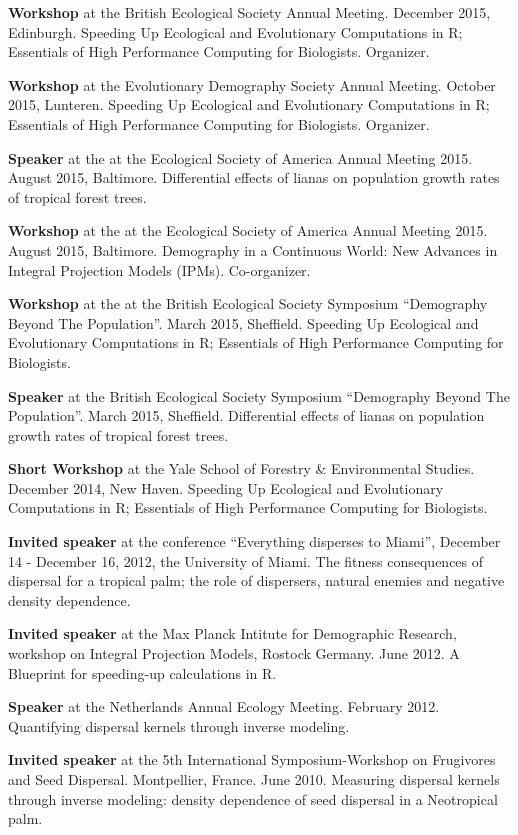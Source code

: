 \begin{description}
\tightlist
\item[2015]
\textbf{Workshop} at the British Ecological Society Annual Meeting.
December 2015, Edinburgh. Speeding Up Ecological and Evolutionary
Computations in R; Essentials of High Performance Computing for
Biologists. Organizer.

\textbf{Workshop} at the Evolutionary Demography Society Annual Meeting.
October 2015, Lunteren. Speeding Up Ecological and Evolutionary
Computations in R; Essentials of High Performance Computing for
Biologists. Organizer.

\textbf{Speaker} at the at the Ecological Society of America Annual
Meeting 2015. August 2015, Baltimore. Differential effects of lianas on
population growth rates of tropical forest trees.

\textbf{Workshop} at the at the Ecological Society of America Annual
Meeting 2015. August 2015, Baltimore. Demography in a Continuous World:
New Advances in Integral Projection Models (IPMs). Co-organizer.

\textbf{Workshop} at the at the British Ecological Society Symposium
``Demography Beyond The Population''. March 2015, Sheffield. Speeding Up
Ecological and Evolutionary Computations in R; Essentials of High
Performance Computing for Biologists.

\textbf{Speaker} at the British Ecological Society Symposium
``Demography Beyond The Population''. March 2015, Sheffield.
Differential effects of lianas on population growth rates of tropical
forest trees.
\item[2014]
\textbf{Short Workshop} at the Yale School of Forestry \& Environmental
Studies. December 2014, New Haven. Speeding Up Ecological and
Evolutionary Computations in R; Essentials of High Performance Computing
for Biologists.
\item[2012:]
\textbf{Invited speaker} at the conference ``Everything disperses to
Miami'', December 14 - December 16, 2012, the University of Miami. The
fitness consequences of dispersal for a tropical palm; the role of
dispersers, natural enemies and negative density dependence.

\textbf{Invited speaker} at the Max Planck Intitute for Demographic
Research, workshop on Integral Projection Models, Rostock Germany. June
2012. A Blueprint for speeding-up calculations in R.

\textbf{Speaker} at the Netherlands Annual Ecology Meeting. February
2012. Quantifying dispersal kernels through inverse modeling.
\item[2010]
\textbf{Invited speaker} at the 5th International Symposium-Workshop on
Frugivores and Seed Dispersal. Montpellier, France. June 2010. Measuring
dispersal kernels through inverse modeling: density dependence of seed
dispersal in a Neotropical palm.


\end{description}
